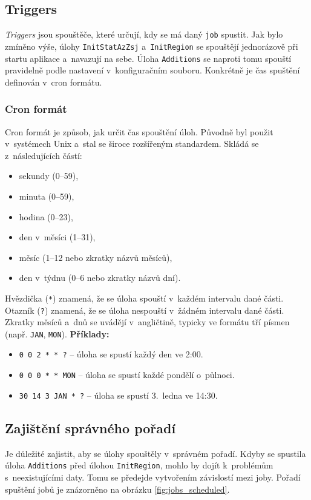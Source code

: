 \subsection{Triggers}
\textit{Triggers} jsou spouštěče, které určují, kdy se má daný \texttt{job} spustit.  
Jak bylo zmíněno výše, úlohy \texttt{InitStatAzZsj} a~\texttt{InitRegion} se spouštějí jednorázově při startu aplikace a~navazují na sebe.  
Úloha \texttt{Additions} se naproti tomu spouští pravidelně podle nastavení v~konfiguračním souboru.  
Konkrétně je čas spuštění definován v~cron formátu.

\subsubsection*{Cron formát}
Cron formát je způsob, jak určit čas spouštění úloh.  
Původně byl použit v~systémech Unix a~stal se široce rozšířeným standardem.  
Skládá se z~následujících částí:
\begin{itemize}
    \item sekundy (0--59),
    \item minuta (0--59),
    \item hodina (0--23),
    \item den v~měsíci (1--31),
    \item měsíc (1--12 nebo zkratky názvů měsíců),
    \item den v~týdnu (0--6 nebo zkratky názvů dní).
\end{itemize}
Hvězdička (\texttt{*}) znamená, že se úloha spouští v~každém intervalu dané části.
Otazník (\texttt{?}) znamená, že se úloha nespouští v~žádném intervalu dané části.
Zkratky měsíců a~dnů se uvádějí v~angličtině, typicky ve formátu tří písmen (např. \texttt{JAN}, \texttt{MON}).
\textbf{Příklady:}
\begin{itemize}
    \item \texttt{0 0 2 * * ?} -- úloha se spustí každý den ve 2:00.
    \item \texttt{0 0 0 * * MON} -- úloha se spustí každé pondělí o~půlnoci.
    \item \texttt{30 14 3 JAN * ?} -- úloha se spustí 3.~ledna ve 14:30.
\end{itemize}

\subsection{Zajištění správného pořadí}
Je důležité zajistit, aby se úlohy spouštěly v~správném pořadí.
Kdyby se spustila úloha \texttt{Additions} před úlohou \texttt{InitRegion}, 
mohlo by dojít k~problémům s~neexistujícími daty.
Tomu se předejde vytvořením závislostí mezi joby.
Pořadí spuštění jobů je znázorněno na obrázku \ref{fig:jobs_scheduled}.

